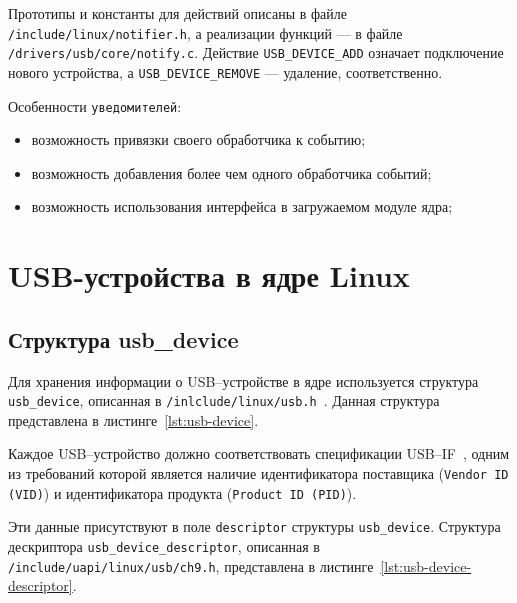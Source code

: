 
Прототипы и константы для действий описаны в файле \texttt{/include/linux/notifier.h}, а реализации функций --- в файле\\ \texttt{/drivers/usb/core/notify.c}. Действие \texttt{USB\_DEVICE\_ADD} означает подключение нового устройства, а \texttt{USB\_DEVICE\_REMOVE} --- удаление, соответственно.

Особенности \texttt{уведомителей}:

\begin{itemize}
	\item возможность привязки своего обработчика к событию;
	\item возможность добавления более чем одного обработчика событий;
	\item возможность использования интерфейса в загружаемом модуле ядра;
\end{itemize}

\section{USB-устройства в ядре Linux}

\subsection{Структура usb\_device}

Для хранения информации о USB--устройстве в ядре используется структура \texttt{usb\_device}, описанная в \texttt{/inlclude/linux/usb.h}~\cite{usb_device}. Данная структура представлена в листинге~\ref{lst:usb-device}.


Каждое USB--устройство должно соответствовать спецификации USB--IF~\cite{usbspec}, одним из требований которой является наличие идентификатора поставщика (\texttt{Vendor ID (VID)}) и идентификатора продукта (\texttt{Product ID (PID)}). 

Эти данные присутствуют в поле \texttt{descriptor} структуры \texttt{usb\_device}. Структура дескриптора \texttt{usb\_device\_descriptor}, описанная в \texttt{/include/uapi/linux/usb/ch9.h}, представлена в листинге~\ref{lst:usb-device-descriptor}.


